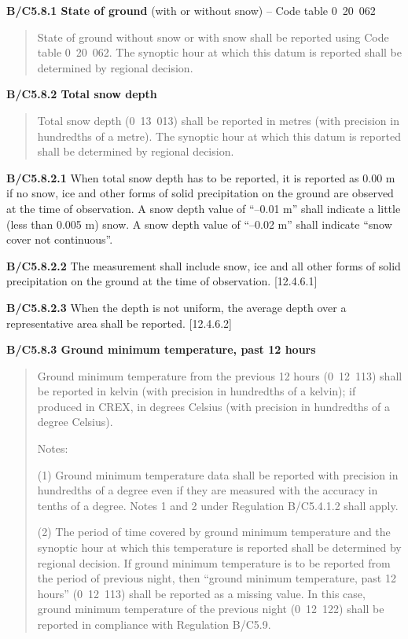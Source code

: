 \textbf{B/C5.8.1 State of ground} (with or without snow) -- Code table 0~20~062

\begin{quote}
State of ground without snow or with snow shall be reported using Code table 0~20~062. The synoptic hour at which this datum is reported shall be determined by regional decision.
\end{quote}

\textbf{B/C5.8.2 Total snow depth}

\begin{quote}
Total snow depth (0~13~013) shall be reported in metres (with precision in hundredths of a metre). The synoptic hour at which this datum is reported shall be determined by regional decision.
\end{quote}

\textbf{B/C5.8.2.1} When total snow depth has to be reported, it is reported as 0.00 m if no snow, ice and other forms of solid precipitation on the ground are observed at the time of observation. A snow depth value of ``--0.01 m'' shall indicate a little (less than 0.005 m) snow. A snow depth value of ``--0.02 m'' shall indicate ``snow cover not continuous''.

\textbf{B/C5.8.2.2} The measurement shall include snow, ice and all other forms of solid precipitation on the ground at the time of observation. {[}12.4.6.1{]}

\textbf{B/C5.8.2.3} When the depth is not uniform, the average depth over a representative area shall be reported. {[}12.4.6.2{]}

\textbf{B/C5.8.3 Ground minimum temperature, past 12 hours}

\begin{quote}
Ground minimum temperature from the previous 12 hours (0~12~113) shall be reported in kelvin (with precision in hundredths of a kelvin); if produced in CREX, in degrees Celsius (with precision in hundredths of a degree Celsius).

Notes:

(1) Ground minimum temperature data shall be reported with precision in hundredths of a degree even if they are measured with the accuracy in tenths of a degree. Notes 1 and 2 under Regulation B/C5.4.1.2 shall apply.

(2) The period of time covered by ground minimum temperature and the synoptic hour at which this temperature is reported shall be determined by regional decision. If ground minimum temperature is to be reported from the period of previous night, then ``ground minimum temperature, past 12 hours'' (0~12~113) shall be reported as a missing value. In this case, ground minimum temperature of the previous night (0~12~122) shall be reported in compliance with Regulation B/C5.9.
\end{quote}

